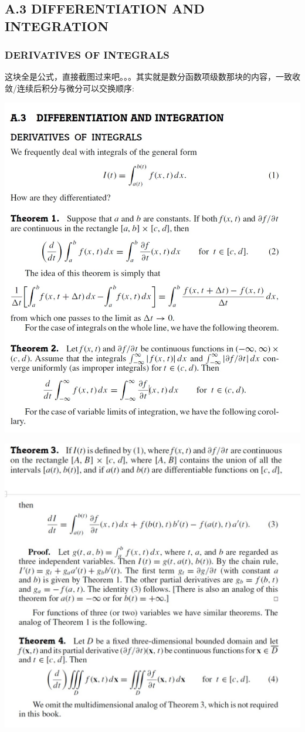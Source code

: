 \documentclass[hazy,blue,11pt]{elegantnote}
\begin{document}
\subsection{A.3 DIFFERENTIATION AND INTEGRATION}
\subsubsection{DERIVATIVES OF INTEGRALS}
这块全是公式，直接截图过来吧。。。其实就是数分函数项级数那块的内容，一致收敛/连续后积分与微分可以交换顺序:

\includegraphics[width=\textwidth,keepaspectratio]
{image/A.3.1.jpg}

\includegraphics[width=\textwidth,keepaspectratio]
{image/A.3.2.jpg}
\end{document}
